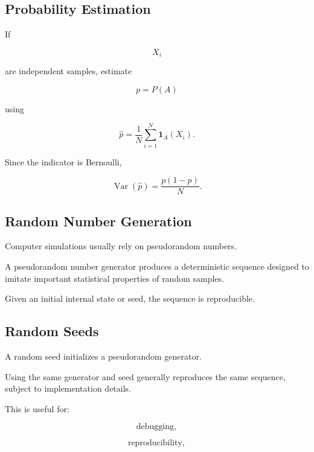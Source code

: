 \subsection{Probability Estimation}
\label{subsec:mc-probability-estimation}

If

\[
X_i
\]

are independent samples, estimate

\[
p=P(A)
\]

using

\[
\boxed{
\widehat{p}
=
\frac1N
\sum_{i=1}^{N}
\mathbf{1}_A(X_i).
}
\]

Since the indicator is Bernoulli,

\[
\boxed{
\operatorname{Var}
(
\widehat{p}
)
=
\frac{
p(1-p)
}{
N
}.
}
\]

\subsection{Random Number Generation}
\label{subsec:random-number-generation}

Computer simulations usually rely on pseudorandom numbers.

A pseudorandom number generator produces a deterministic sequence designed
to imitate important statistical properties of random samples.

Given an initial internal state or seed, the sequence is reproducible.

\subsection{Random Seeds}
\label{subsec:random-seeds}

A random seed initializes a pseudorandom generator.

Using the same generator and seed generally reproduces the same sequence,
subject to implementation details.

This is useful for:

\[
\boxed{
\text{debugging},
}
\]

\[
\boxed{
\text{reproducibility},
}
\]

